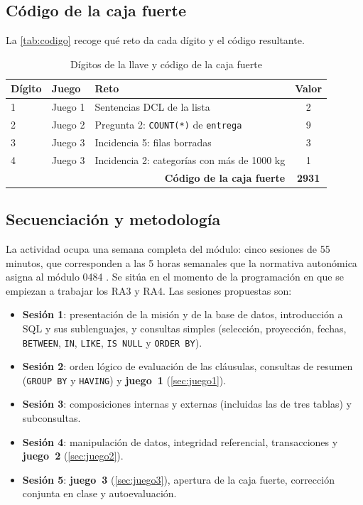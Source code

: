\documentclass[11pt,a4paper]{article}
\begin{document}
\subsection{Código de la caja fuerte}
\label{sec:codigo}

La \autoref{tab:codigo} recoge qué reto da cada dígito y el código resultante.

\begin{table}[H]
\centering
\begin{tabular}{@{}lll c@{}}
\toprule
\textbf{Dígito} & \textbf{Juego} & \textbf{Reto} & \textbf{Valor} \\
\midrule
1 & Juego 1 & Sentencias DCL de la lista & 2 \\
2 & Juego 2 & Pregunta 2: \texttt{COUNT(*)} de \texttt{entrega} & 9 \\
3 & Juego 3 & Incidencia 5: filas borradas & 3 \\
4 & Juego 3 & Incidencia 2: categorías con más de 1000 kg & 1 \\
\midrule
\multicolumn{3}{r}{\textbf{Código de la caja fuerte}} & \textbf{\Large 2931} \\
\bottomrule
\end{tabular}
\caption{Dígitos de la llave y código de la caja fuerte}
\label{tab:codigo}
\end{table}

\subsection{Secuenciación y metodología}
\label{sec:secuencia}

La actividad ocupa una semana completa del módulo: cinco sesiones de 55 minutos, que
corresponden a las 5 horas semanales que la normativa autonómica asigna al módulo 0484
\cite[anexos XLIV y XLV]{murcia2026}. Se sitúa en el momento de la programación en que se
empiezan a trabajar los RA3 y RA4. Las sesiones propuestas son:

\begin{itemize}
  \item \textbf{Sesión 1}: presentación de la misión y de la base de datos, introducción a SQL y
        sus sublenguajes, y consultas simples (selección, proyección, fechas, \texttt{BETWEEN},
        \texttt{IN}, \texttt{LIKE}, \texttt{IS NULL} y \texttt{ORDER BY}).
  \item \textbf{Sesión 2}: orden lógico de evaluación de las cláusulas, consultas de resumen
        (\texttt{GROUP BY} y \texttt{HAVING}) y \textbf{juego~1} (\autoref{sec:juego1}).
  \item \textbf{Sesión 3}: composiciones internas y externas (incluidas las de tres tablas) y
        subconsultas.
  \item \textbf{Sesión 4}: manipulación de datos, integridad referencial, transacciones y
        \textbf{juego~2} (\autoref{sec:juego2}).
  \item \textbf{Sesión 5}: \textbf{juego~3} (\autoref{sec:juego3}), apertura de la caja fuerte,
        corrección conjunta en clase y autoevaluación.
\end{itemize}
\end{document}
